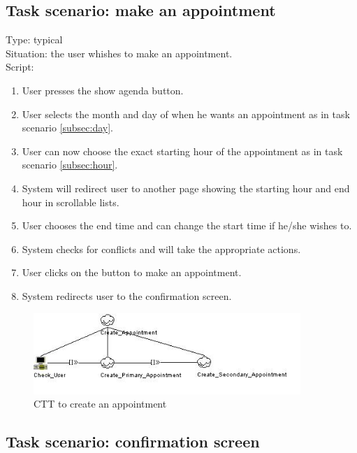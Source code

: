 \documentclass[11pt, a4paper,svglistings]{report}
\begin{document}

\subsection{Task scenario: make an appointment}


\label{subsec:appointment}Type: typical \\
Situation: the user whishes to make an appointment. \\
Script:
\begin{enumerate}
\item User presses the show agenda button.
\item User selects the month and day of when he wants an appointment as in task scenario \ref{subsec:day}.
\item User can now choose the exact starting hour of the appointment as in task scenario \ref{subsec:hour}.
\item System will redirect user to another page showing the starting hour and end hour in scrollable lists.
\item User chooses the end time and can change the start time if he/she wishes to.
\item System checks for conflicts and will take the appropriate actions.
\item User clicks on the button to make an appointment.
\item System redirects user to the confirmation screen.
\end{enumerate}

\begin{figure}[H]
\centering
    \includegraphics[width=0.9\textwidth]{CreateAppointment.jpg}
  \caption[Create appointment CTT]{\label{fig:CreateAppointment}CTT to create an appointment}
\end{figure}

\subsection{Task scenario: confirmation screen}
\end{document}
